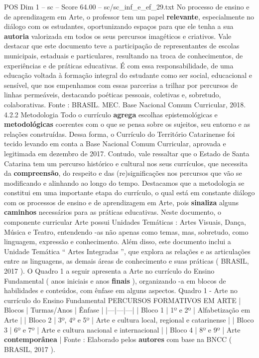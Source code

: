 \begin{textsample}{POS Dim 1 – sc – Score 64.00 – sc/sc\_inf\_e\_ef\_29.txt}
No processo de ensino e de aprendizagem em Arte, o professor tem um papel \textbf{relevante}, especialmente no diálogo com os estudantes, oportunizando espaços para que ele tenha a sua \textbf{autoria} valorizada em todos os seus percursos imagéticos e criativos.
Vale destacar que este documento teve a participação de representantes de escolas municipais, estaduais e particulares, resultando na troca de conhecimentos, de experiências e de práticas educativas.
É com essa responsabilidade, de uma educação voltada à formação integral do estudante como ser social, educacional e sensível, que nos empenhamos com essas parcerias a trilhar por percursos de linhas permeáveis, destacando poéticas pessoais, coletivas e, sobretudo, colaborativas.
Fonte : BRASIL.
MEC.
Base Nacional Comum Curricular, 2018. 4.2.2 Metodologia Todo o currículo \textbf{agrega} escolhas epistemológicas e \textbf{metodológicas} coerentes com o que se pensa sobre os sujeitos, seu entorno e as relações construídas.
Dessa forma, o Currículo do Território Catarinense foi tecido levando em conta a Base Nacional Comum Curricular, aprovada e legitimada em dezembro de 2017.
Contudo, vale ressaltar que o Estado de Santa Catarina tem um percurso histórico e cultural nos seus currículos, que necessita da \textbf{compreensão}, do respeito e das (re)significações nos percursos que vão se modificando e alinhando ao longo do tempo.
Destacamos que a metodologia se constitui em uma importante etapa do currículo, o qual está em constante diálogo com os processos de ensino e de aprendizagem em Arte, pois \textbf{sinaliza} alguns \textbf{caminhos} necessários para as práticas educativas.
Neste documento, o componente curricular Arte possui Unidades Temáticas : Artes Visuais, Dança, Música e Teatro, entendendo -as não apenas como temas, mas, sobretudo, como linguagem, expressão e conhecimento.
Além disso, este documento inclui a Unidade Temática “ Artes Integradas ”, que explora as relações e as articulações entre as linguagens, as demais áreas de conhecimento e suas práticas ( BRASIL, 2017 ).
O Quadro 1 a seguir apresenta a Arte no currículo do Ensino Fundamental ( anos iniciais e anos \textbf{finais} ), organizando -a em blocos de habilidades e conteúdos, com ênfase em alguns aspectos.
Quadro 1 - Arte no currículo do Ensino Fundamental PERCURSOS FORMATIVOS EM ARTE | Blocos | Turmas/Anos | Ênfase | |---|---|---| | Bloco 1 | 1º e 2º | Alfabetização em Arte | | Bloco 2 | 3º, 4º e 5º | Arte e cultura local, regional e catarinense | | Bloco 3 | 6º e 7º | Arte e cultura nacional e internacional | | Bloco 4 | 8º e 9º | Arte \textbf{contemporânea} | Fonte : Elaborado pelos \textbf{autores} com base na BNCC ( BRASIL, 2017 ).

\end{textsample}
